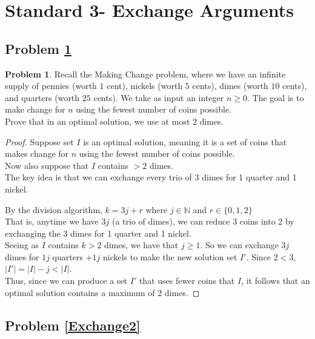 \documentclass[11pt]{article}
\theoremstyle{definition}
\theoremstyle{definition}
\newtheorem{required}{Problem}
\theoremstyle{definition}
\begin{document}
\newpage
\section{Standard 3- Exchange Arguments}
\subsection{Problem \ref{Exchange1}}
\begin{required} \label{Exchange1}
Recall the Making Change problem, where we have an infinite supply of pennies (worth $1$ cent), nickels (worth $5$ cents), dimes (worth $10$ cents), and quarters (worth $25$ cents). We take as input an integer $n \geq 0$. The goal is to make change for $n$ using the fewest number of coins possible. \\

\noindent Prove that in an optimal solution, we use at most $2$ dimes. 
\end{required}

\begin{proof}

Suppose set $I$ is an optimal solution, meaning it is a set of coins that makes change for $n$ using the fewest number of coins possible. \\
Now also suppose that $I$ contains $> 2$ dimes. \\

The key idea is that we can exchange every trio of 3 dimes for 1 quarter and 1 nickel.

By the division algorithm, $k= 3j + r$ where $j \in \mathbb{N}$ and $r \in \{0, 1, 2\} $ \\
That is, anytime we have $3j$ (a trio of dimes), we can reduce 3 coins into 2 by exchanging the 3 dimes for 1 quarter and 1 nickel.  \\

Seeing as $I$ contains $k >2$ dimes, we have that $j \geq 1$. So we can exchange $3j$ dimes for $1j$ quarters $+ 1j$ nickels to make the new solution set $I'$.  Since $2<3$, $|I'| = |I| - j < |I|$. \\

Thus, since we can produce a set $I'$ that uses fewer coins that $I$, it follows that an optimal solution contains a maximum of 2 dimes. 


\end{proof}



\newpage
\subsection{Problem \ref{Exchange2}}
\end{document}
